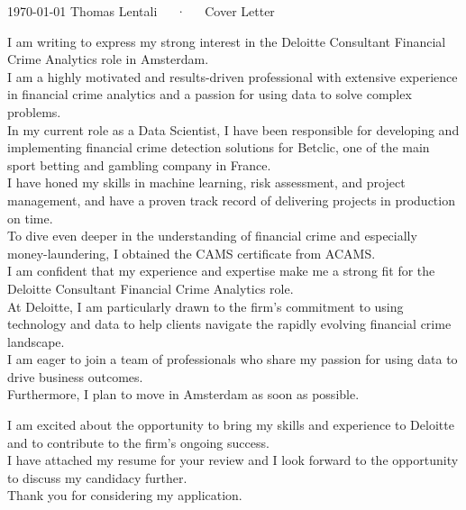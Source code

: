 \documentclass[11pt, a4paper]{awesome-cv}
\begin{document}
\makecvheader[R]

\makecvfooter
  {\today}
  {Thomas Lentali~~~·~~~Cover Letter}
  {}

\makelettertitle

\begin{cvletter}

I am writing to express my strong interest in the Deloitte Consultant Financial Crime Analytics role in Amsterdam.  \\
I am a highly motivated and results-driven professional with extensive experience in financial crime analytics and a passion for using data to solve complex problems.\\

In my current role as a Data Scientist, I have been responsible for developing and implementing financial crime detection solutions for Betclic, one of the main sport betting and gambling company in France.\\ 
I have honed my skills in machine learning, risk assessment, and project management, and have a proven track record of delivering projects in production on time.\\
To dive even deeper in the understanding of financial crime and especially money-laundering, I obtained the CAMS certificate from ACAMS. \\
I am confident that my experience and expertise make me a strong fit for the Deloitte Consultant Financial Crime Analytics role.\\

At Deloitte, I am particularly drawn to the firm's commitment to using technology and data to help clients navigate the rapidly evolving financial crime landscape. \\
I am eager to join a team of professionals who share my passion for using data to drive business outcomes.\\
Furthermore, I plan to move in Amsterdam as soon as possible.

I am excited about the opportunity to bring my skills and experience to Deloitte and to contribute to the firm's ongoing success. \\
I have attached my resume for your review and I look forward to the opportunity to discuss my candidacy further.\\

Thank you for considering my application.

\end{cvletter}


\makeletterclosing
\end{document}
